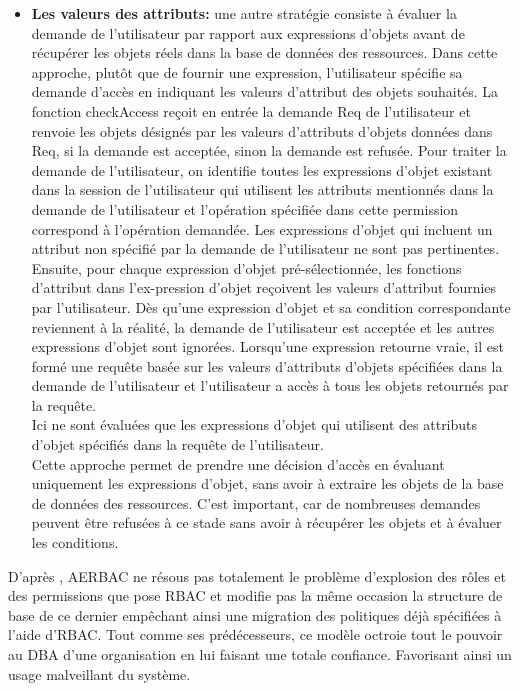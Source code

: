 \begin{itemize}
\begin{itemize}
\item \textbf{Les valeurs des attributs:} une autre stratégie consiste à évaluer la demande de l'utilisateur par rapport aux expressions d'objets avant de récupérer les objets réels dans la base de données des ressources. Dans cette approche, plutôt que de fournir une expression, l'utilisateur spécifie sa demande d'accès en indiquant les valeurs d'attribut des objets souhaités. La fonction checkAccess reçoit en entrée la demande Req de l'utilisateur et renvoie les objets désignés par les valeurs d'attributs d'objets données dans Req, si la demande est acceptée, sinon la demande est refusée. Pour traiter la demande de l'utilisateur, on identifie toutes les expressions d'objet existant dans la session de l'utilisateur qui utilisent les attributs mentionnés dans la demande de l'utilisateur et l'opération spécifiée dans cette permission correspond à l'opération demandée. Les expressions d'objet qui incluent un attribut non spécifié par la demande de l'utilisateur ne sont pas pertinentes. Ensuite, pour chaque expression d'objet pré-sélectionnée, les fonctions d'attribut dans l'ex-pression d'objet reçoivent les valeurs d'attribut fournies par l'utilisateur. Dès qu'une expression d'objet et sa condition correspondante reviennent à la réalité, la demande de l'utilisateur est acceptée et les autres expressions d'objet sont ignorées. Lorsqu'une expression retourne vraie, il est formé une requête basée sur les valeurs d'attributs d'objets spécifiées dans la demande de l'utilisateur et l'utilisateur a accès à tous les objets retournés par la requête. \\
\hspace*{0.5cm} Ici ne sont évaluées que les expressions d'objet qui utilisent des attributs d'objet spécifiés dans la requête de l'utilisateur. \\
\hspace*{0.5cm} Cette approche permet de prendre une décision d'accès en évaluant uniquement les expressions d'objet, sans avoir à extraire les objets de la base de données des ressources. C'est important, car de nombreuses demandes peuvent être refusées à ce stade sans avoir à récupérer les objets et à évaluer les conditions. 

\end{itemize}
\end{itemize}

\label{sectionInconvéniantARBAC}

D'après \cite{singh19}, AERBAC ne résous pas totalement le problème d'explosion des rôles et des permissions que pose RBAC et modifie pas la même occasion la structure de base de ce dernier empêchant ainsi une migration des politiques déjà spécifiées à l'aide d'RBAC. Tout comme ses prédécesseurs, ce modèle octroie tout le pouvoir au DBA d'une organisation en lui faisant une totale confiance. Favorisant ainsi un usage malveillant du système.

